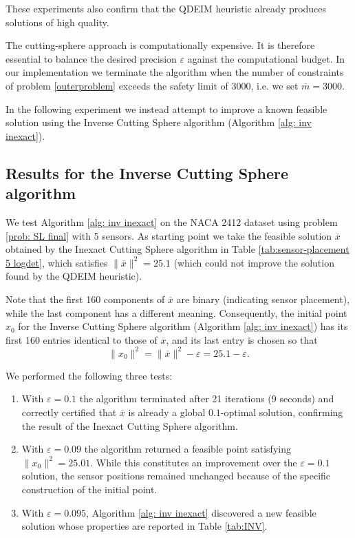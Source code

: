\documentclass[12pt]{amsart}
\theoremstyle{plain}
\theoremstyle{definition}
\begin{document}
These experiments also confirm that the QDEIM heuristic already produces solutions of high quality. 

The cutting-sphere approach is computationally expensive. It is therefore essential to balance the desired precision \(\varepsilon\) against the computational budget. In our implementation we terminate the algorithm when the number of constraints of problem \eqref{outerproblem} exceeds the safety limit of 3000, i.e. we set $\overline{m}=3000$.

In the following experiment we instead attempt to improve a known feasible solution using the Inverse Cutting Sphere algorithm (Algorithm \ref{alg: inv inexact}).

\subsection{Results for the Inverse Cutting Sphere algorithm}

We test Algorithm \ref{alg: inv inexact} on the NACA 2412 dataset using problem \eqref{prob: SL final} with 5 sensors. As starting point we take the feasible solution \(\overline{x}\) obtained by the Inexact Cutting Sphere algorithm in Table \ref{tab:sensor-placement 5 logdet}, which satisfies \(\|\overline{x}\|^2 = 25.1\) (which could not improve the solution found by the QDEIM heuristic).

Note that the first 160 components of \(\overline{x}\) are binary (indicating sensor placement), while the last component has a different meaning. Consequently, the initial point \(x_0\) for the Inverse Cutting Sphere algorithm (Algorithm \ref{alg: inv inexact}) has its first 160 entries identical to those of \(\overline{x}\), and its last entry is chosen so that
\[
\|x_0\|^2 = \|\overline{x}\|^2 - \varepsilon = 25.1 - \varepsilon.
\]

We performed the following three tests:

\begin{enumerate}
    \item With \(\varepsilon = 0.1\) the algorithm terminated after 21 iterations (9 seconds) and correctly certified that \(\overline{x}\) is already a global \(0.1\)-optimal solution, confirming the result of the Inexact Cutting Sphere algorithm.
    
    \item With \(\varepsilon = 0.09\) the algorithm returned a feasible point satisfying \(\|x_0\|^2 = 25.01\). While this constitutes an improvement over the \(\varepsilon = 0.1\) solution, the sensor positions remained unchanged because of the specific construction of the initial point.
    
    \item With \(\varepsilon = 0.095\), Algorithm \ref{alg: inv inexact} discovered a new feasible solution whose properties are reported in Table \ref{tab:INV}.
\end{enumerate}
\end{document}
